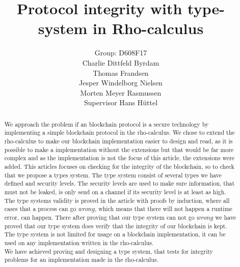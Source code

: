 \mainmatter  %

\title{Protocol integrity with type-system in Rho-calculus}




\author{Group: D608F17\\Charlie Dittfeld Byrdam\\Thomas Frandsen\\Jesper Windelborg Nielsen\\Morten Meyer Rasmussen\\Supervisor Hans Hüttel}




\toctitle{}
\tocauthor{}
\maketitle
\begin{abstract}
We approach the problem if an blockchain protocol is a secure technology by implementing a simple blockchain protocol in the rho-calculus. We chose to extend the rho-calculus to make our blockchain implementation easier to design and read, as it is possible to make a implementation without the extensions but that would be far more complex and as the implementation is not the focus of this article, the extensions were added. This articles focuses on checking for the integrity of the blockchain, so to check that we propose a types system. The type system consist of several types we have defined and security levels. The security levels are used to make sure information, that must not be leaked, is only send on a channel if its security level is at least as high.\\
    The type systems validity is proved in the article with proofs by induction, where all cases that a process can go \ensuremath{wrong}, which means that there will not happen a runtime error, can happen. There after proving that our type system can not go \ensuremath{wrong} we have proved that our type system does verify that the integrity of our blockchain is kept. The type system is not limited for usage on a blockchain implementation, it can be used on any implementation written in the rho-calculus.\\
We have achieved proving and designing a type system, that tests for integrity problems for an implementation made in the rho-calculus.
\end{abstract}
\clearpage
